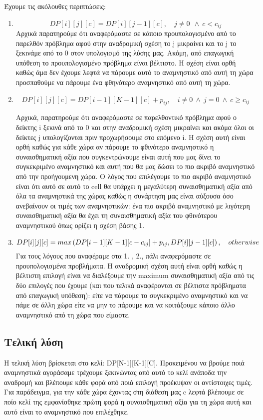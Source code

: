 \documentclass[a4paper,oneside, 11pt]{article}
\begin{document}
Έχουμε τις ακόλουθες περιπτώσεις:
\begin{enumerate}
	\item $$DP[i][j][c] = DP[i][j-1][c],\quad  j\neq 0 \  \ \wedge \ c < c_{ij}$$
	Αρχικά παρατηρούμε ότι αναφερόμαστε σε κάποιο προυπολογισμένο από το παρελθόν πρόβλημα αφού στην αναδρομική σχέση το j μικραίνει και το j το ξεκινάμε από το 0 στον υπολογισμό της λύσης μας. Ακόμη, από επαγωγική υπόθεση το προυπολογισμένο πρόβλημα είναι βέλτιστο.
	Η σχέση είναι ορθή καθώς άμα δεν έχουμε λεφτά να πάρουμε αυτό το αναμνηστικό από αυτή τη χώρα προσπαθούμε να πάρουμε ένα φθηνότερο αναμνηστικό από αυτή τη χώρα.
	\item $$DP[i][j][c] = DP[i-1][K-1][c] + p_{ij},\quad i\neq 0 \ \wedge \ j=0 \ \wedge \ c\geq c_{ij}$$
	
	Αρχικά, παρατηρούμε ότι αναφερόμαστε σε παρελθοντικό πρόβλημα αφού ο δείκτης i ξεκινά από το 0 και στην αναδρομική σχέση μικραίνει και ακόμα όλοι οι δείκτες j υπολογίζονται πριν προχωρήσουμε στο επόμενο i.
	Η σχέση αυτή είναι ορθή καθώς για κάθε χώρα αν πάρουμε το φθινότερο αναμνηστικό η συναισθηματική αξία που συγκεντρώνουμε είναι αυτή που μας δίνει το συγκεκριμένο αναμνηστικό και αυτή που θα μας δώσει το πιο ακριβό αναμνηστικό από την προήγουμενη χώρα. Ο λόγος που επιλέγουμε το πιο ακριβό αναμνηστικό είναι ότι αυτό σε αυτό το cell θα υπάρχει η μεγαλύτερη συναισθηματική αξία από όλα τα αναμνηστικά της χώρας καθώς η συνάρτηση μας είναι αύξουσα όσο ανεβαίνουν οι τιμές των αναμνηστικών: ένα πιο ακριβό αναμνηστικό με λιγότερη συναισθηματική αξία θα έχει τη συναισθηματική αξία του φθινότερου αναμνηστικού όπως ορίζει η  σχέση βάσης 1.
	\item $$DP[i][j][c] = max\left(DP[i-1][K-1][c - c_{ij}] + p_{ij}, DP[i][j-1][c]\right), \quad otherwise \\$$
	Για τους λόγους που αναφέραμε στα 1. , 2., πάλι αναφερόμαστε σε προυπολογισμένα προβλήματα.
	Η αναδρομική σχέση αυτή είναι ορθή καθώς η βέλτιστη επιλογή είναι να διαλέξουμε την maximum συναισθηματική αξία από τις δύο επιλογές που έχουμε (και που τελικά αναφέρονται σε βέλτιστα πρόβληματα από επαγωγική υπόθεση): είτε να πάρουμε το συγκεκριμένο αναμνηστικό και να πάμε σε άλλη χώρα είτε να μην το πάρουμε και να κοιτάξουμε κάποιο άλλο αναμνηστικό από τη χώρα που είμαστε.
	
\end{enumerate}

\subsection*{Τελική λύση}
Η τελική λύση βρίσκεται στο κελί: DP[N-1][K-1][C]. Προκειμένου να βρούμε ποιά αναμνηστικά αγοράσαμε τρέχουμε ξεκινώντας από αυτό το κελί ανάποδα την αναδρομή και βλέπουμε κάθε φορά από ποιά επιλογή προέκυψαν οι αντίστοιχες τιμές. Για παράδειγμα, για την κάθε χώρα έχοντας στη διάθεση μας c λεφτά βλέπουμε σε ποίο κελί της εμφανίσθηκε πρώτη φορά η συναισθηματική αξία για τη χώρα αυτή και αυτό είναι το αναμνηστικό που επιλέχθηκε.
\end{document}

